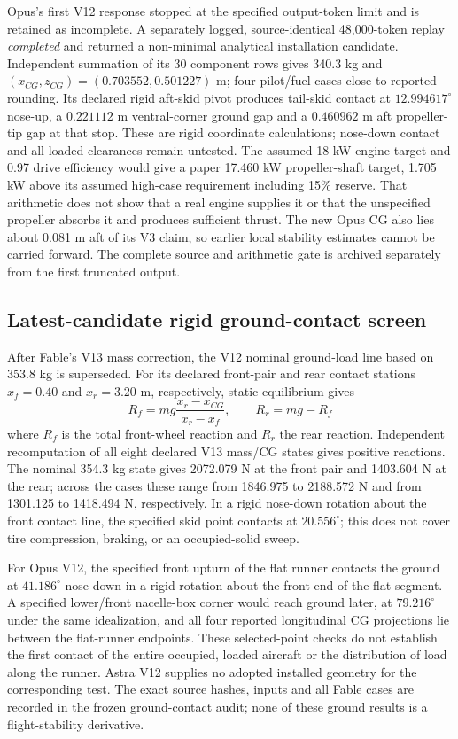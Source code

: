 \documentclass[11pt,a4paper]{article}
\begin{document}
Opus's first V12 response stopped at the specified output-token limit and is retained as incomplete. A separately logged, source-identical 48,000-token replay \emph{completed} and returned a non-minimal analytical installation candidate. Independent summation of its 30 component rows gives 340.3 kg and $(x_{CG},z_{CG})=(0.703552,0.501227)$ m; four pilot/fuel cases close to reported rounding. Its declared rigid aft-skid pivot produces tail-skid contact at $12.994617^\circ$ nose-up, a $0.221112$ m ventral-corner ground gap and a $0.460962$ m aft propeller-tip gap at that stop. These are rigid coordinate calculations; nose-down contact and all loaded clearances remain untested. The assumed 18 kW engine target and 0.97 drive efficiency would give a paper 17.460 kW propeller-shaft target, 1.705 kW above its assumed high-case requirement including 15\% reserve. That arithmetic does not show that a real engine supplies it or that the unspecified propeller absorbs it and produces sufficient thrust. The new Opus CG also lies about 0.081 m aft of its V3 claim, so earlier local stability estimates cannot be carried forward. The complete source and arithmetic gate is archived separately from the first truncated output.

\subsection{Latest-candidate rigid ground-contact screen}
After Fable's V13 mass correction, the V12 nominal ground-load line based on
353.8 kg is superseded. For its declared front-pair and rear contact stations
$x_f=0.40$ and $x_r=3.20$ m, respectively, static equilibrium gives
\begin{equation}\label{eq:groundreactions}
R_f=mg\frac{x_r-x_{CG}}{x_r-x_f},\qquad R_r=mg-R_f
\end{equation}
where $R_f$ is the total front-wheel reaction and $R_r$ the rear reaction.
Independent recomputation of all eight declared V13 mass/CG states gives
positive reactions. The nominal 354.3 kg state gives 2072.079 N at the front
pair and 1403.604 N at the rear; across the cases these range from 1846.975
to 2188.572 N and from 1301.125 to 1418.494 N, respectively. In a rigid
nose-down rotation about the front contact line, the specified skid point
contacts at $20.556^\circ$; this does not cover tire compression, braking,
or an occupied-solid sweep.

For Opus V12, the specified front upturn of the flat runner contacts the
ground at $41.186^\circ$ nose-down in a rigid rotation about the front end
of the flat segment. A specified lower/front nacelle-box corner would reach
ground later, at $79.216^\circ$ under the same idealization, and all four
reported longitudinal CG projections lie between the flat-runner endpoints.
These selected-point checks do not establish the first contact of the entire
occupied, loaded aircraft or the distribution of load along the runner.
Astra V12 supplies no adopted installed geometry for the corresponding test.
The exact source hashes, inputs and all Fable cases are recorded in the frozen
ground-contact audit; none of these ground results is a flight-stability
derivative.
\end{document}
